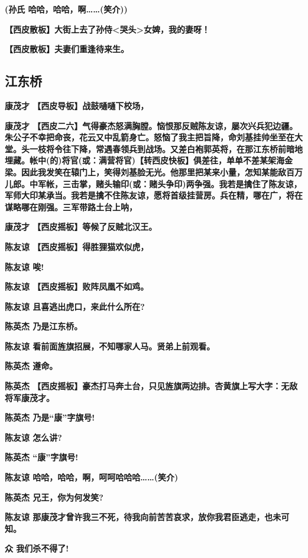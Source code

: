 \textbf{(孙氏 哈哈，哈哈，啊\ldots{}\ldots{}(笑介))}

\textbf{【西皮散板】大街上去了孙侍\textless{}哭头\textgreater{}女婢，我的妻呀！}

\textbf{【西皮散板】夫妻们重逢待来生。}

\newpage
\hypertarget{ux6c5fux4e1cux6865}{%
\subsection{江东桥}\label{ux6c5fux4e1cux6865}}

\textbf{康茂才 【西皮导板】战鼓嗵嗵下校场，}

\textbf{康茂才
【西皮二六】气得豪杰怒满胸膛。恼恨那反贼陈友谅，屡次兴兵犯边疆。朱公子不幸把命丧，花云又中乱箭身亡。怒恼了我主把旨降，命刘基挂帅坐至在大堂。头一枝将令往下降，常遇春领兵到战场。又差白袍郭英将，在那江东桥前暗地埋藏。帐中(的)将官(或：满营将官)【转西皮快板】俱差往，单单不差某架海金梁。因此我发笑在辕门上，笑得刘基脸无光。他那里把某来小量，怎知某能敌百万儿郎。中军帐，三击掌，赌头输印(或：赌头争印)两争强。我若是擒住了陈友谅，军师大印某承当。我若是擒不住陈友谅，愿将首级挂营房。兵在精，哪在广，将在谋略哪在刚强。三军带路土台上呐，}

\textbf{康茂才 【西皮摇板】等候了反贼北汉王。}

\textbf{陈友谅 【西皮摇板】得胜狸猫欢似虎，}

\textbf{陈友谅 唉!}

\textbf{陈友谅 【西皮摇板】败阵凤凰不如鸡。}

\textbf{陈友谅 且喜逃出虎口，来此什么所在?}

\textbf{陈英杰 乃是江东桥。}

\textbf{陈友谅 看前面旌旗招展，不知哪家人马。贤弟上前观看。}

\textbf{陈英杰 遵命。}

\textbf{陈英杰
【西皮摇板】豪杰打马奔土台，只见旌旗两边排。杏黄旗上写大字：无敌将军康茂才。}

\textbf{陈英杰 乃是``康''字旗号!}

\textbf{陈友谅 怎么讲?}

\textbf{陈英杰 ``康''字旗号!}

\textbf{陈友谅 哈哈，哈哈，啊，呵呵哈哈哈\ldots{}\ldots{}(笑介)}

\textbf{陈英杰 兄王，你为何发笑?}

\textbf{陈友谅
那康茂才曾许我三不死，待我向前苦苦哀求，放你我君臣逃走，也未可知。}

\textbf{众 我们杀不得了!}

